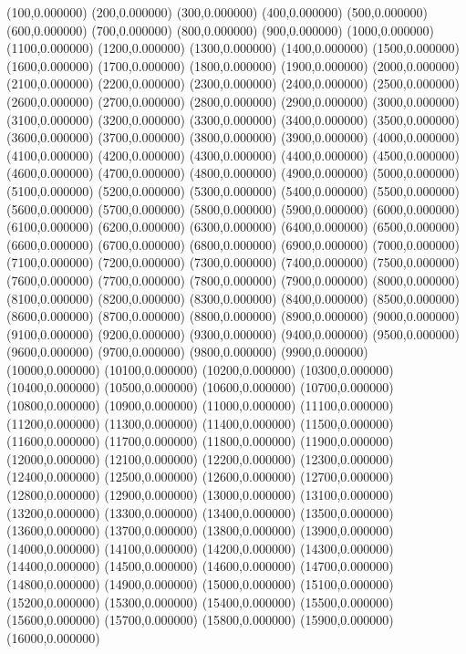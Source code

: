 (100,0.000000)
(200,0.000000)
(300,0.000000)
(400,0.000000)
(500,0.000000)
(600,0.000000)
(700,0.000000)
(800,0.000000)
(900,0.000000)
(1000,0.000000)
(1100,0.000000)
(1200,0.000000)
(1300,0.000000)
(1400,0.000000)
(1500,0.000000)
(1600,0.000000)
(1700,0.000000)
(1800,0.000000)
(1900,0.000000)
(2000,0.000000)
(2100,0.000000)
(2200,0.000000)
(2300,0.000000)
(2400,0.000000)
(2500,0.000000)
(2600,0.000000)
(2700,0.000000)
(2800,0.000000)
(2900,0.000000)
(3000,0.000000)
(3100,0.000000)
(3200,0.000000)
(3300,0.000000)
(3400,0.000000)
(3500,0.000000)
(3600,0.000000)
(3700,0.000000)
(3800,0.000000)
(3900,0.000000)
(4000,0.000000)
(4100,0.000000)
(4200,0.000000)
(4300,0.000000)
(4400,0.000000)
(4500,0.000000)
(4600,0.000000)
(4700,0.000000)
(4800,0.000000)
(4900,0.000000)
(5000,0.000000)
(5100,0.000000)
(5200,0.000000)
(5300,0.000000)
(5400,0.000000)
(5500,0.000000)
(5600,0.000000)
(5700,0.000000)
(5800,0.000000)
(5900,0.000000)
(6000,0.000000)
(6100,0.000000)
(6200,0.000000)
(6300,0.000000)
(6400,0.000000)
(6500,0.000000)
(6600,0.000000)
(6700,0.000000)
(6800,0.000000)
(6900,0.000000)
(7000,0.000000)
(7100,0.000000)
(7200,0.000000)
(7300,0.000000)
(7400,0.000000)
(7500,0.000000)
(7600,0.000000)
(7700,0.000000)
(7800,0.000000)
(7900,0.000000)
(8000,0.000000)
(8100,0.000000)
(8200,0.000000)
(8300,0.000000)
(8400,0.000000)
(8500,0.000000)
(8600,0.000000)
(8700,0.000000)
(8800,0.000000)
(8900,0.000000)
(9000,0.000000)
(9100,0.000000)
(9200,0.000000)
(9300,0.000000)
(9400,0.000000)
(9500,0.000000)
(9600,0.000000)
(9700,0.000000)
(9800,0.000000)
(9900,0.000000)
(10000,0.000000)
(10100,0.000000)
(10200,0.000000)
(10300,0.000000)
(10400,0.000000)
(10500,0.000000)
(10600,0.000000)
(10700,0.000000)
(10800,0.000000)
(10900,0.000000)
(11000,0.000000)
(11100,0.000000)
(11200,0.000000)
(11300,0.000000)
(11400,0.000000)
(11500,0.000000)
(11600,0.000000)
(11700,0.000000)
(11800,0.000000)
(11900,0.000000)
(12000,0.000000)
(12100,0.000000)
(12200,0.000000)
(12300,0.000000)
(12400,0.000000)
(12500,0.000000)
(12600,0.000000)
(12700,0.000000)
(12800,0.000000)
(12900,0.000000)
(13000,0.000000)
(13100,0.000000)
(13200,0.000000)
(13300,0.000000)
(13400,0.000000)
(13500,0.000000)
(13600,0.000000)
(13700,0.000000)
(13800,0.000000)
(13900,0.000000)
(14000,0.000000)
(14100,0.000000)
(14200,0.000000)
(14300,0.000000)
(14400,0.000000)
(14500,0.000000)
(14600,0.000000)
(14700,0.000000)
(14800,0.000000)
(14900,0.000000)
(15000,0.000000)
(15100,0.000000)
(15200,0.000000)
(15300,0.000000)
(15400,0.000000)
(15500,0.000000)
(15600,0.000000)
(15700,0.000000)
(15800,0.000000)
(15900,0.000000)
(16000,0.000000)
